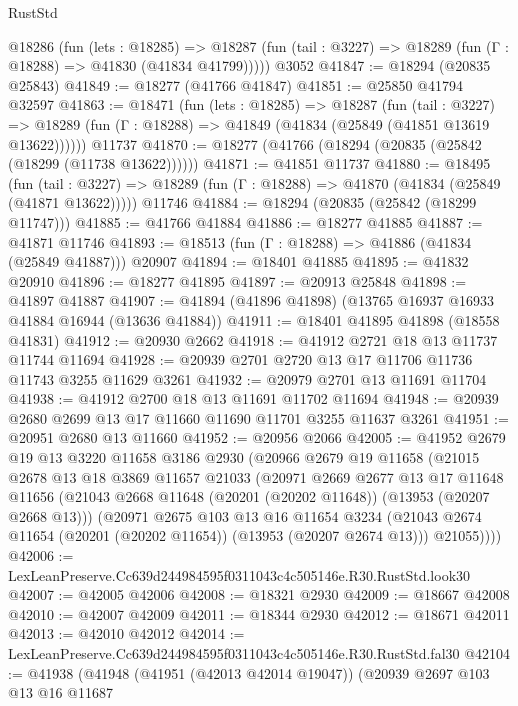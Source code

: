 \begin{lexlean}{RustStd}
\begin{coremodule}
    @18286
      (fun (lets : @18285) =>
      @18287 (fun (tail : @3227) => @18289 (fun (Γ : @18288) => @41830 (@41834 @41799)))))
    @3052
@41847 := @18294 (@20835 @25843)
@41849 := @18277 (@41766 @41847)
@41851 := @25850 @41794 @32597
@41863 := @18471
    (fun (lets : @18285) =>
    @18287
      (fun (tail : @3227) =>
      @18289 (fun (Γ : @18288) => @41849 (@41834 (@25849 (@41851 @13619 @13622))))))
    @11737
@41870 := @18277 (@41766 (@18294 (@20835 (@25842 (@18299 (@11738 @13622))))))
@41871 := @41851 @11737
@41880 := @18495
    (fun (tail : @3227) => @18289 (fun (Γ : @18288) => @41870 (@41834 (@25849 (@41871 @13622)))))
    @11746
@41884 := @18294 (@20835 (@25842 (@18299 @11747)))
@41885 := @41766 @41884
@41886 := @18277 @41885
@41887 := @41871 @11746
@41893 := @18513 (fun (Γ : @18288) => @41886 (@41834 (@25849 @41887))) @20907
@41894 := @18401 @41885
@41895 := @41832 @20910
@41896 := @18277 @41895
@41897 := @20913 @25848
@41898 := @41897 @41887
@41907 := @41894 (@41896 @41898) (@13765 @16937 @16933 @41884 @16944 (@13636 @41884))
@41911 := @18401 @41895 @41898 (@18558 @41831)
@41912 := @20930 @2662
@41918 := @41912 @2721 @18 @13 @11737 @11744 @11694
@41928 := @20939 @2701 @2720 @13 @17 @11706 @11736 @11743 @3255 @11629 @3261
@41932 := @20979 @2701 @13 @11691 @11704
@41938 := @41912 @2700 @18 @13 @11691 @11702 @11694
@41948 := @20939 @2680 @2699 @13 @17 @11660 @11690 @11701 @3255 @11637 @3261
@41951 := @20951 @2680 @13 @11660
@41952 := @20956 @2066
@42005 := @41952
    @2679
    @19
    @13
    @3220
    @11658
    @3186
    @2930
    (@20966
      @2679
      @19
      @11658
      (@21015
        @2678
        @13
        @18
        @3869
        @11657
        @21033
        (@20971
          @2669
          @2677
          @13
          @17
          @11648
          @11656
          (@21043 @2668 @11648 (@20201 (@20202 @11648)) (@13953 (@20207 @2668 @13)))
          (@20971
            @2675
            @103
            @13
            @16
            @11654
            @3234
            (@21043 @2674 @11654 (@20201 (@20202 @11654)) (@13953 (@20207 @2674 @13)))
            @21055))))
@42006 := LexLeanPreserve.Cc639d244984595f0311043c4c505146e.R30.RustStd.look30
@42007 := @42005 @42006
@42008 := @18321 @2930
@42009 := @18667 @42008
@42010 := @42007 @42009
@42011 := @18344 @2930
@42012 := @18671 @42011
@42013 := @42010 @42012
@42014 := LexLeanPreserve.Cc639d244984595f0311043c4c505146e.R30.RustStd.fal30
@42104 := @41938
    (@41948
      (@41951 (@42013 @42014 @19047))
      (@20939
        @2697
        @103
        @13
        @16
        @11687

\end{coremodule}
\end{lexlean}
